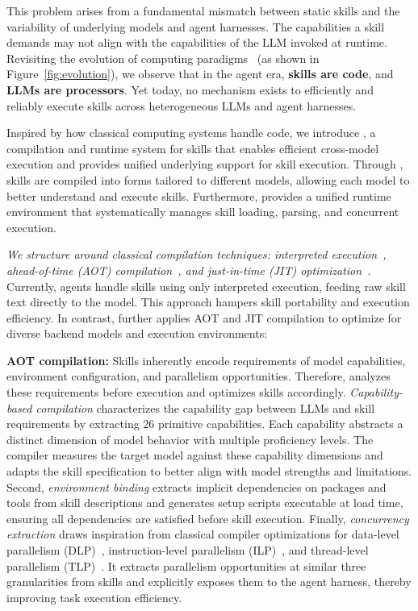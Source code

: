 This problem arises from a fundamental mismatch between static skills and the variability of underlying models and agent harnesses.
The capabilities a skill demands may not align with the capabilities
of the LLM invoked at runtime. Revisiting the evolution of computing paradigms~\cite{stroustrup2013c++, venners1998java, cramer1997compiling} (as shown in Figure~\ref{fig:evolution}), we observe that
in the agent era, \textbf{skills are code}, and \textbf{LLMs are processors}. Yet today, no mechanism
exists to efficiently and reliably execute skills across heterogeneous LLMs and agent harnesses.


Inspired by how classical computing systems handle code, we introduce
\sys, a compilation and runtime system for skills that enables
efficient cross-model execution and provides unified underlying
support for skill execution. Through \sys, skills are compiled
into forms tailored to different models, allowing each model to
better understand and execute skills. Furthermore, \sys provides a unified runtime
environment that systematically manages skill loading, parsing,
and concurrent execution.

\textit{We structure \sys around classical compilation techniques:
interpreted execution~\cite{jansen2007interpretation}, ahead-of-time (AOT) compilation~\cite{serrano2021javascript, serrano2018javascript}, and just-in-time (JIT)
optimization~\cite{aho2006compilers, aycock2003jit, suganuma2000overview, ishizaki2000study, cramer1997compiling}.} Currently, agents handle skills using only interpreted
execution, feeding raw skill text directly to the model. This approach
hampers skill portability and execution efficiency. In contrast, \sys further applies
AOT and JIT compilation to optimize for diverse backend models and execution
environments:

\textbf{AOT compilation:} Skills inherently encode requirements of model capabilities, environment configuration, and parallelism opportunities. 
Therefore, \sys analyzes these requirements before execution and optimizes skills accordingly.
\emph{Capability-based compilation} characterizes the capability gap between LLMs and skill requirements by extracting 26 primitive capabilities. 
Each capability abstracts a distinct dimension of model behavior with multiple proficiency levels.
The compiler measures the target model against these capability dimensions and adapts the skill specification to better align with model strengths and limitations.
Second, \emph{environment binding} extracts implicit dependencies on packages and tools from skill descriptions and generates setup scripts executable at load time, ensuring all dependencies are satisfied before skill execution.
Finally, \emph{concurrency extraction} draws inspiration from classical compiler optimizations for data-level parallelism (DLP)~\cite{kalathingal2016dynamic}, instruction-level parallelism (ILP)~\cite{ranganathan1998empirical, kastner2001ilp}, and thread-level parallelism (TLP)~\cite{redstone2003mini}. It extracts parallelism opportunities at similar three granularities from skills and explicitly exposes them to the agent harness, thereby improving task execution efficiency.


